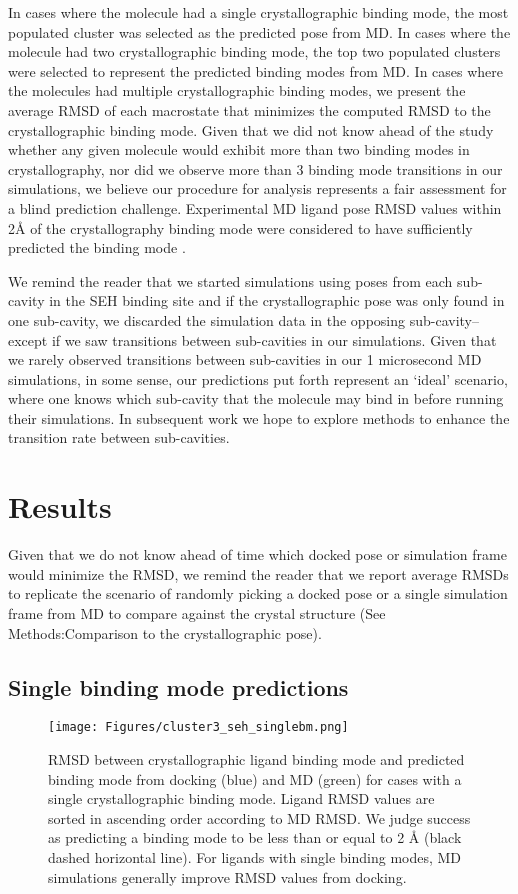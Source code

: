 \documentclass[journal=jcisd8,manuscript=article]{achemso}
\begin{document}
In cases where the molecule had a single crystallographic binding mode, the most populated cluster was selected as the predicted pose from MD.
In cases where the molecule had two crystallographic binding mode, the top two populated clusters were selected to represent the predicted binding modes from MD.
In cases where the molecules had multiple crystallographic binding modes, we present the average RMSD of each macrostate that minimizes the computed RMSD to the crystallographic binding mode.
Given that we did not know ahead of the study whether any given molecule would exhibit more than two binding modes in crystallography, nor did we observe more than 3 binding mode transitions in our simulations, we believe our procedure for analysis represents a fair assessment for a blind prediction challenge.
Experimental MD ligand pose RMSD values within 2{\AA} of the crystallography binding mode were considered to have sufficiently predicted the binding mode \cite{warren_critical_2006} \cite{plewczynski_can_2011}. 

We remind the reader that we started simulations using poses from each sub-cavity in the SEH binding site and if the crystallographic pose was only found in one sub-cavity, we discarded the simulation data in the opposing sub-cavity--except if we saw transitions between sub-cavities in our simulations.
Given that we rarely observed transitions between sub-cavities in our 1 microsecond MD simulations, in some sense, our predictions put forth represent an `ideal' scenario, where one knows which sub-cavity that the molecule may bind in before running their simulations. 
In subsequent work we hope to explore methods to enhance the transition rate between sub-cavities.

\section{Results}
Given that we do not know ahead of time which docked pose or simulation frame would minimize the RMSD, we remind the reader that we report average RMSDs to replicate the scenario of randomly picking a docked pose or a single simulation frame from MD to compare against the crystal structure (See Methods:Comparison to the crystallographic pose).

\subsection{Single binding mode predictions}
\begin{figure}
    \centering
    \texttt{[image: Figures/cluster3\_seh\_singlebm.png]}
    \caption[SEH MD Single Binding Mode Ligands]{RMSD between crystallographic ligand binding mode and predicted binding mode from docking (blue) and MD (green) for cases with a single crystallographic binding mode. Ligand RMSD values are sorted in ascending order according to MD RMSD. We judge success as predicting a binding mode to be less than or equal to 2 {\AA} (black dashed horizontal line). For ligands with single binding modes, MD simulations generally improve RMSD values from docking.}
    \label{fig:rmsd-singlebm}
\end{figure}
\end{document}
